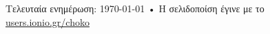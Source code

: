 \documentclass[11pt, a4paper]{article}
\begin{document}
\vfill{}

\begin{center}
{\scriptsize  Τελευταία ενημέρωση: \today\- •\-
Η σελιδοποίση έγινε με το \href{https://github.com/mrzool/cv-boilerplate}{
\XeTeX }\\
\href{http://users.ionio.gr/choko}{users.ionio.gr/choko}}
\end{center}
\end{document}
